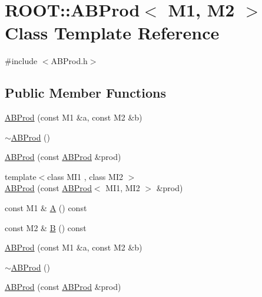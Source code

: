 \hypertarget{classROOT_1_1Minuit2_1_1ABProd}{}\section{R\+O\+OT\+:\+:A\+B\+Prod$<$ M1, M2 $>$ Class Template Reference}
\label{classROOT_1_1Minuit2_1_1ABProd}


{\ttfamily \#include $<$A\+B\+Prod.\+h$>$}

\subsection*{Public Member Functions}
\begin{DoxyCompactItemize}
\item 
\mbox{\hyperlink{classROOT_1_1Minuit2_1_1ABProd_aee50cf5b18a146adca10f08b5475ec9b}{A\+B\+Prod}} (const M1 \&a, const M2 \&b)
\item 
\mbox{\hyperlink{classROOT_1_1Minuit2_1_1ABProd_acf17bb5e9c597f836bf033c8a56c1195}{$\sim$\+A\+B\+Prod}} ()
\item 
\mbox{\hyperlink{classROOT_1_1Minuit2_1_1ABProd_a7e68f6f5154087b32415717962556992}{A\+B\+Prod}} (const \mbox{\hyperlink{classROOT_1_1Minuit2_1_1ABProd}{A\+B\+Prod}} \&prod)
\item 
{\footnotesize template$<$class M\+I1 , class M\+I2 $>$ }\\\mbox{\hyperlink{classROOT_1_1Minuit2_1_1ABProd_a792de1723360074762c646a30e7889f3}{A\+B\+Prod}} (const \mbox{\hyperlink{classROOT_1_1Minuit2_1_1ABProd}{A\+B\+Prod}}$<$ M\+I1, M\+I2 $>$ \&prod)
\item 
const M1 \& \mbox{\hyperlink{classROOT_1_1Minuit2_1_1ABProd_a14f6ecd4f0a72010d6c2a8e7f2916cfa}{A}} () const
\item 
const M2 \& \mbox{\hyperlink{classROOT_1_1Minuit2_1_1ABProd_a526658028b2971b0dbf6f1b78b05d6a7}{B}} () const
\item 
\mbox{\hyperlink{classROOT_1_1Minuit2_1_1ABProd_aee50cf5b18a146adca10f08b5475ec9b}{A\+B\+Prod}} (const M1 \&a, const M2 \&b)
\item 
\mbox{\hyperlink{classROOT_1_1Minuit2_1_1ABProd_acf17bb5e9c597f836bf033c8a56c1195}{$\sim$\+A\+B\+Prod}} ()
\item 
\mbox{\hyperlink{classROOT_1_1Minuit2_1_1ABProd_a7e68f6f5154087b32415717962556992}{A\+B\+Prod}} (const \mbox{\hyperlink{classROOT_1_1Minuit2_1_1ABProd}{A\+B\+Prod}} \&prod)
\item 

\end{DoxyCompactItemize}
